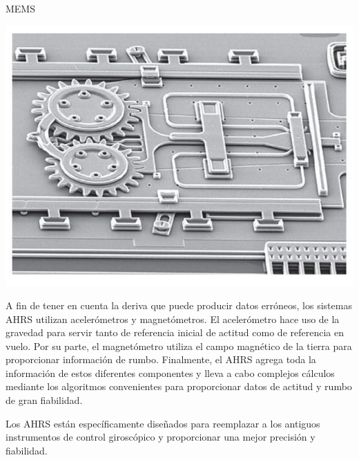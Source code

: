 \begin{myboxAzul}{\ac{MEMS}}
\begin{minipage}[c]{0.60\linewidth}
  \end{minipage} \hspace{1em}
  \begin{minipage}[c]{0.35\linewidth}
    \includegraphics[width=\linewidth]{07.directores.y.ctrol.automatico.vuelo/imagenes/07MeMS.jpeg}
    \label{fig:07.MEMS}
  \end{minipage}
\end{myboxAzul}


A fin de tener en cuenta la deriva que  puede producir datos erróneos, los sistemas AHRS utilizan acelerómetros y magnetómetros. El acelerómetro hace uso de la gravedad para servir tanto de referencia inicial de actitud como de referencia en vuelo. Por su parte, el magnetómetro utiliza el campo magnético de la tierra para proporcionar información de rumbo. Finalmente, el AHRS agrega toda la información de estos diferentes componentes y lleva a cabo complejos cálculos mediante los algoritmos convenientes para proporcionar datos de actitud y rumbo de gran fiabilidad.



Los \ac{AHRS}
 están espec\'ificamente dise\~nados para reemplazar a los antiguos instrumentos de control girosc\'opico y proporcionar una mejor precisi\'on y fiabilidad. 





